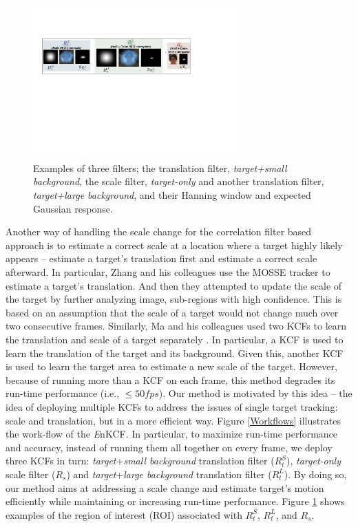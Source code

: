 \documentclass[10pt,twocolumn,letterpaper]{article}
\begin{document}
\begin{figure}[!h]
\centering
\includegraphics[width=0.70\textwidth]{./figures/Filters_Details.pdf}
\caption{Examples of three filters; the translation filter,
  \textit{target+small background}, the scale filter,
  \textit{target-only} and another translation filter,
  \textit{target+large background}, and their Hanning window and
  expected Gaussian response.}
\label{fig:Filters}
\end{figure}

Another way of handling the scale change for the correlation filter
based approach is to estimate a correct scale at a location where a
target highly likely appears \cite{zhang2014fast} -- estimate a
target's translation first and estimate a correct scale afterward. In
particular, Zhang and his colleagues use the MOSSE tracker to estimate
a target's translation. And then they attempted to update the scale of
the target by further analyzing image, sub-regions with high
confidence. This is based on an assumption that the scale of a target
would not change much over two consecutive frames. Similarly, Ma and
his colleagues used two KCFs to learn the translation and scale of a
target separately \cite{ma2015long}. In particular, a KCF is used to
learn the translation of the target and its background. Given this,
another KCF is used to learn the target area to estimate a new scale
of the target. However, because of running more than a KCF on each
frame, this method degrades its run-time performance (i.e., $\leq 50
fps$). Our method is motivated by this idea -- the idea of deploying
multiple KCFs to address the issues of single target tracking: scale
and translation, but in a more efficient way. Figure \ref{Workflows}
illustrates the work-flow of the {\it E}nKCF. In particular, to
maximize run-time performance and accuracy, instead of running them
all together on every frame, we deploy three KCFs in turn:
\textit{target}+\textit{small background} translation filter
($R_{t}^{S}$), \textit{target-only} scale filter ($R_{s}$) and
\textit{target}+\textit{large background} translation filter
($R_{t}^{L}$). By doing so, our method aims at addressing a scale
change and estimate target's motion efficiently while maintaining or
increasing run-time performance. Figure \ref{fig:Filters} shows
examples of the region of interest (ROI) associated with $R_{t}^{S}$,
$R_{t}^{L}$, and $R_{s}$.
\end{document}
